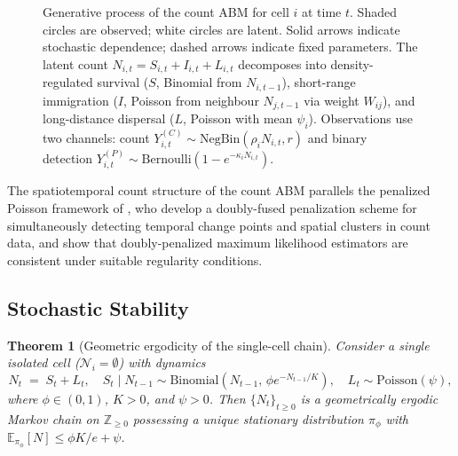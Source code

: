 \documentclass[review,12pt]{elsarticle}
\newtheorem{theorem}{Theorem}
\theoremstyle{definition}
\newcommand{\E}{\mathbb{E}}
\begin{document}
\begin{figure}[t]
\caption{Generative process of the count ABM for cell $i$ at time $t$.
  Shaded circles are observed; white circles are latent.
  Solid arrows indicate stochastic dependence; dashed arrows indicate fixed
  parameters.  The latent count $N_{i,t}=S_{i,t}+I_{i,t}+L_{i,t}$ decomposes
  into density-regulated survival ($S$, Binomial from $N_{i,t-1}$), short-range
  immigration ($I$, Poisson from neighbour $N_{j,t-1}$ via weight $W_{ij}$),
  and long-distance dispersal ($L$, Poisson with mean $\psi_i$).
  Observations use two channels: count $Y^{(C)}_{i,t}\sim\mathrm{NegBin}(\rho_i N_{i,t},r)$
  and binary detection $Y^{(P)}_{i,t}\sim\mathrm{Bernoulli}(1-e^{-\kappa_i N_{i,t}})$.}
\label{fig:model}
\end{figure}
The spatiotemporal count structure of the count ABM parallels the penalized Poisson
framework of \citet{zhang2025csda}, who develop a doubly-fused penalization
scheme for simultaneously detecting temporal change points and spatial clusters
in count data, and show that doubly-penalized maximum likelihood estimators are
consistent under suitable regularity conditions.

\subsection{Stochastic Stability}

\begin{theorem}[Geometric ergodicity of the single-cell chain]
\label{thm:ergodicity}
Consider a single isolated cell ($\mathcal{N}_i=\emptyset$) with dynamics
\[
  N_t \;=\; S_t + L_t,
  \quad
  S_t \mid N_{t-1} \sim \mathrm{Binomial}\!\left(N_{t-1},\,\phi e^{-N_{t-1}/K}\right),
  \quad
  L_t \sim \mathrm{Poisson}(\psi),
\]
where $\phi\in(0,1)$, $K>0$, and $\psi > 0$.  Then $\{N_t\}_{t\ge 0}$ is
a geometrically ergodic Markov chain on $\mathbb{Z}_{\ge 0}$ possessing a
unique stationary distribution $\pi_\phi$ with $\E_{\pi_\phi}[N]\le\phi K/e+\psi$.
\end{theorem}
\end{document}
